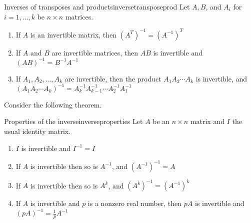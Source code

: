 \begin{theorem}{Inverses of transposes and products}{inversetransposeprod}
Let $A, B$, and $A_i$ for $i=1,...,k$ be $n \times n$ matrices. 
\begin{enumerate}
\item
If $A$ is an invertible matrix, then $(A^{T})^{-1} = (A^{-1})^{T}$
\item
If $A$ and $B$ are invertible matrices, then $AB$ is invertible and $(AB)^{-1} = B^{-1}A^{-1}$
\item
If $A_1, A_2, ..., A_k$ are invertible, then the product $A_1A_2 \cdots A_k$ is invertible, and $(A_1A_2 \cdots A_k)^{-1} = A_k^{-1}A_{k-1}^{-1} \cdots A_2^{-1}A_1^{-1}$
\end{enumerate}
\end{theorem}

Consider the following theorem.

\begin{theorem}{Properties of the inverse}{inverseproperties}
Let $A$ be an $n \times n$ matrix and $I$ the usual identity matrix. 
\begin{enumerate}
\item
$I$ is invertible and $I^{-1} = I$
\item
If $A$ is invertible then so is $A^{-1}$, and $(A^{-1})^{-1} = A$
\item
If $A$ is invertible then so is $A^k$, and $(A^k)^{-1} = (A^{-1})^k$
\item
If $A$ is invertible and $p$ is a nonzero real number, then $pA$ is invertible and $(pA)^{-1} = \frac{1}{p}A^{-1}$
\end{enumerate}
\end{theorem}
